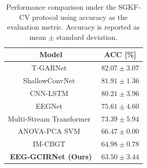 \begin{table}[H]
    \centering
    \caption{Performance comparison under the SGKF-CV protocol using accuracy as the evaluation metric. Accuracy is reported as mean $\pm$ standard deviation.}
    \label{tab:sgkf_accuracy_comparison}
    \begin{tabularx}{\textwidth}{CC}
        \toprule
        \textbf{Model} & \textbf{ACC [\%]} \\
        \midrule
        T-GARNet~\cite{salazar2025tgarnet} 
        & $\mathbf{82.07 \pm 3.07}$ \\
        
        ShallowConvNet~\cite{schirrmeister2017deep} 
        & $81.91 \pm 1.36$ \\
        
        CNN-LSTM~\cite{wang2022cnnlstm_adhd} 
        & $80.21 \pm 3.96$ \\
        
        EEGNet~\cite{lawhern2018eegnet} 
        & $75.61 \pm 4.60$ \\
        
        Multi-Stream Transformer~\cite{delvigne2022icpr_transformer_attention} 
        & $73.39 \pm 5.94$ \\
        
        ANOVA-PCA SVM~\cite{alim2023signals_anovapca_svm} 
        & $66.47 \pm 0.00$ \\
        
        IM-CBGT~\cite{alsharif2024aims_imcbgt} 
        & $64.98 \pm 0.78$ \\
        
        \textbf{EEG-GCIRNet ({Ours})} 
        & $63.50 \pm 3.44$ \\
        \bottomrule
    \end{tabularx}
\end{table}



